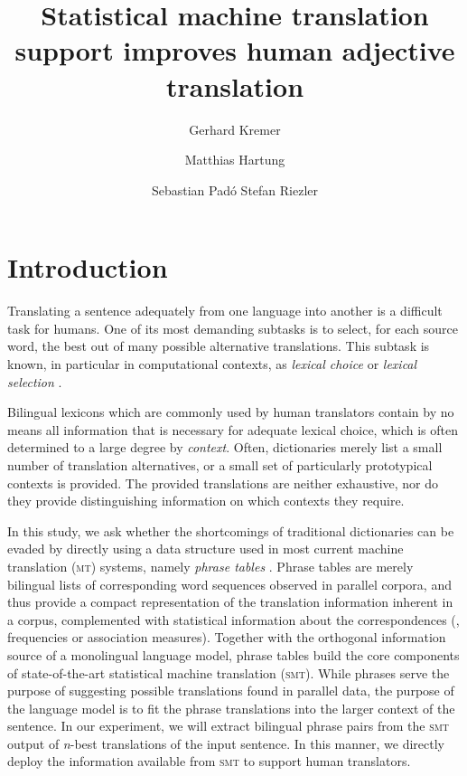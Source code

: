 \documentclass[output=paper]{LSP/langsci}
\author{Gerhard Kremer\and
 Matthias Hartung\and
   Sebastian Padó\lastand
 Stefan Riezler}
\affiliation{Institute for Computational Linguistics, %
   University of Heidelberg\\
}
\title{Statistical machine translation support         improves human adjective translation}
\begin{document}
\section[Introduction]{Introduction}
\label{sec:kremer:intro}
Translating a sentence adequately from one language into another is a
difficult task for humans. One of its most demanding subtasks is to
select, for each source word, the best out of many possible
alternative translations. This subtask is known, in particular in
computational contexts, as \emph{lexical choice} or \emph{lexical
selection} \citep{Wu:1994:VSL:981732.981751}.

Bilingual lexicons which are commonly used by human translators
contain by no means all information that is necessary for adequate
lexical choice, which is often determined to a large degree by
\emph{context}. Often, dictionaries merely list a small number of
translation alternatives, or a small set of particularly prototypical
contexts is provided. The provided translations are neither
exhaustive, nor do they provide distinguishing information on which
contexts they require.

In this study, we ask whether the shortcomings of traditional
dictionaries can be evaded by directly using a data structure used in
most current machine translation (\textsc{mt}) systems, namely
\emph{phrase tables} \cite{Koehn:10:SMT}. Phrase tables are
merely bilingual lists of corresponding word sequences observed in
parallel corpora, and thus provide a compact representation of the
translation information inherent in a corpus, complemented with
statistical information about the correspondences (\eg, frequencies or
association measures).  Together with the orthogonal information
source of a monolingual language model, phrase tables build the core
components of state-of-the-art statistical machine translation
(\textsc{smt}). While phrases serve the purpose of suggesting possible
translations found in parallel data, the purpose of the language model
is to fit the phrase translations into the larger context of the
sentence. In our experiment, we will extract bilingual phrase pairs
from the \textsc{smt} output of \emph{n}-best translations of the
input sentence. In this manner, we directly deploy the information
available from \textsc{smt} to support human translators.
\end{document}

